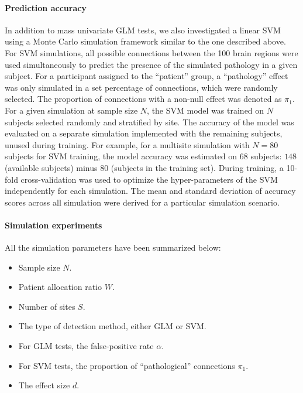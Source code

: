 \documentclass[authoryear]{elsarticle}
\begin{document}

\paragraph{Prediction accuracy}
In addition to mass univariate GLM tests, we also investigated a linear SVM
\citep{Cortes1995} using a Monte Carlo simulation framework similar to the one
described above. For SVM simulations, all possible connections between the 100
brain regions were used simultaneously to predict the presence of the simulated
pathology in a given subject. For a participant assigned to the ``patient''
group, a ``pathology'' effect was only simulated in a set percentage of
connections, which were randomly selected. The proportion of connections with a
non-null effect was denoted as $\pi_1$. For a given simulation at sample size
$N$, the SVM model was trained on $N$ subjects selected randomly and stratified
by site. The accuracy of the model was evaluated on a separate simulation
implemented with the remaining subjects, unused during training. For example,
for a multisite simulation with $N=80$ subjects for SVM training, the model
accuracy was estimated on $68$ subjects: $148$ (available subjects) minus $80$
(subjects in the training set). During training, a 10-fold cross-validation was
used to optimize the hyper-parameters of the SVM independently for each
simulation. The mean and standard deviation of accuracy scores across all
simulation were derived for a particular simulation scenario.

\paragraph{Simulation experiments}

All the simulation parameters have been summarized below: 
\begin{itemize}
 \item Sample size $N$. 
 \item Patient allocation ratio $W$. 
 \item Number of sites $S$. 
 \item The type of detection method, either GLM or SVM. 
 \item For GLM tests, the false-positive rate $\alpha$. 
 \item For SVM tests, the proportion of ``pathological'' connections $\pi_1$.
 \item The effect size $d$. 
\end{itemize}
\end{document}
